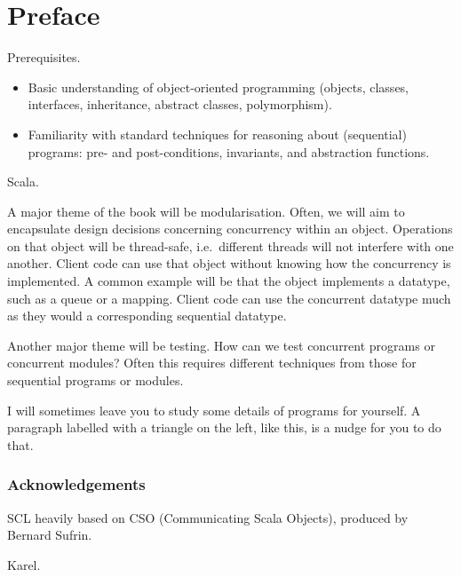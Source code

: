 \chapter*{Preface}



Prerequisites.
%
\begin{itemize}

\item Basic understanding of object-oriented programming (objects, classes,
interfaces, inheritance, abstract classes, polymorphism).

\item Familiarity with standard techniques for reasoning about (sequential)
programs:  pre- and post-conditions, invariants, and abstraction functions.
\end{itemize}

Scala.

A major theme of the book will be modularisation.  Often, we will aim to
encapsulate design decisions concerning concurrency within an object.
Operations on that object will be thread-safe, i.e.~different threads will not
interfere with one another.  Client code can use that object without knowing
how the concurrency is implemented.  A common example will be that the object
implements a datatype, such as a queue or a mapping.  Client code can use the
concurrent datatype much as they would a corresponding sequential datatype. 

Another major theme will be testing.  How can we test concurrent programs or
concurrent modules?  Often this requires different techniques from those for
sequential programs or modules. 


\begin{instruction}
I will sometimes leave you to study some details of programs for yourself.  A
paragraph labelled with a triangle on the left, like this, is a nudge for you
to do that.
\end{instruction}


\subsection*{Acknowledgements}



SCL heavily based on CSO (Communicating Scala Objects), produced by Bernard
Sufrin.

Karel.

